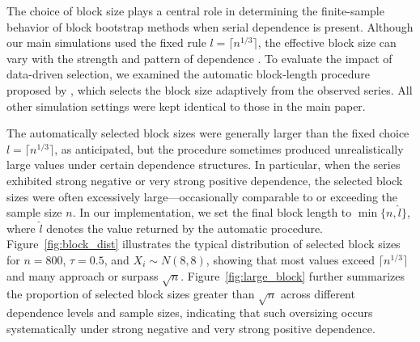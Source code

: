 \documentclass[12pt]{article}
\begin{document}
The choice of block size plays a central role in determining the
finite-sample behavior of block bootstrap methods when serial
dependence is present. Although our main simulations used the fixed rule
$l = \lceil n^{1/3} \rceil$, the effective block size can vary with the
strength and pattern of dependence
\citep{hall1995blocking, buhlmann1999block, politis2004automatic}.
To evaluate the impact of data-driven selection, we examined the
automatic block-length procedure proposed by
\citet{politis2004automatic}, which selects the block size adaptively
from the observed series. All other simulation settings were kept
identical to those in the main paper.


The automatically selected block sizes were generally larger than the
fixed choice $l = \lceil n^{1/3} \rceil$, as anticipated, but the
procedure sometimes produced unrealistically large values under certain
dependence structures. In particular, when the series exhibited strong
negative or very strong positive dependence, the selected block sizes
were often excessively large---occasionally comparable to or exceeding
the sample size $n$. In our implementation, we set the final block
length to $\min\{n, \hat{l}\}$, where $\hat{l}$ denotes the value
returned by the automatic procedure. Figure~\ref{fig:block_dist}
illustrates the typical distribution of selected block sizes for $n =
800$, $\tau = 0.5$, and $X_i \sim N(8,8)$, showing that most values
exceed $\lceil n^{1/3} \rceil$ and many approach or surpass
$\sqrt{n}$. Figure~\ref{fig:large_block} further summarizes the
proportion of selected block sizes greater than $\sqrt{n}$ across
different dependence levels and sample sizes, indicating that such
oversizing occurs systematically under strong negative and very strong
positive dependence.
\end{document}
